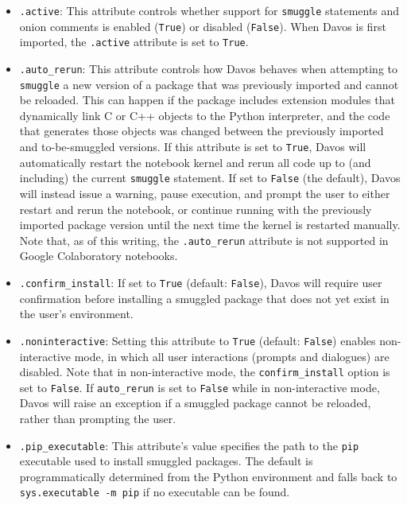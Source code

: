 \documentclass[preprint,12pt,a4paper]{elsarticle}
\begin{document}
\begin{itemize}
\item \texttt{.active}: This attribute controls whether support for \texttt{smuggle}
  statements and onion comments is enabled (\texttt{True}) or
  disabled (\texttt{False}).  When Davos is first imported,
  the \texttt{.active} attribute is set to \texttt{True}.

\item \texttt{.auto\_rerun}: This attribute controls how
  Davos behaves when attempting to \texttt{smuggle} a new
  version of a package that was previously imported and cannot be
  reloaded. This can happen if the package includes extension modules
  that dynamically link C or C++ objects to the Python interpreter,
  and the code that generates those objects was changed between the
  previously imported and to-be-smuggled versions.  If this attribute
  is set to \texttt{True}, Davos will automatically restart
  the notebook kernel and rerun all code up to (and including) the
  current \texttt{smuggle} statement. If set to \texttt{False} (the default),
  Davos will instead issue a warning, pause execution, and
  prompt the user to either restart and rerun the notebook, or
  continue running with the previously imported package version until
  the next time the kernel is restarted manually.  Note that, as of
  this writing, the \texttt{.auto\_rerun} attribute is not supported
  in Google Colaboratory notebooks.

\item \texttt{.confirm\_install}: If set to \texttt{True} (default:
  \texttt{False}), Davos will require user confirmation
  before installing a smuggled package that does not yet exist in the
  user's environment.

\item \texttt{.noninteractive}: Setting this attribute to
  \texttt{True} (default: \texttt{False}) enables non-in\-ter\-act\-ive
  mode, in which all user interactions (prompts and dialogues) are
  disabled. Note that in non-interactive mode, the
  \texttt{confirm\_install} option is set to \texttt{False}.  If
  \texttt{auto\_rerun} is set to \texttt{False} while in non-interactive
  mode, Davos will raise an exception if a smuggled package
  cannot be reloaded, rather than prompting the user.

\item \texttt{.pip\_executable}: This attribute's value specifies the
  path to the \texttt{pip} executable used to install smuggled
  packages. The default is programmatically determined from the Python
  environment and falls back to \texttt{sys.executable -m pip} if no
  executable can be found.


\end{itemize}
\end{document}

